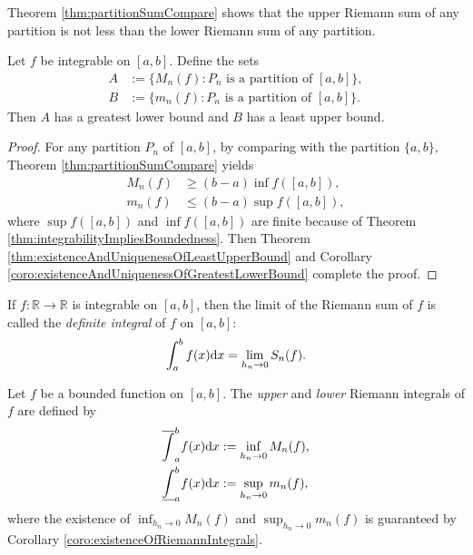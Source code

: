 \begin{rem}
  Theorem \ref{thm:partitionSumCompare} shows that
  the upper Riemann sum of any partition is not less than
  the lower Riemann sum of any partition.
\end{rem}

\begin{coro}
  \label{coro:existenceOfRiemannIntegrals}
  Let $f$ be integrable on $[a,b]$. Define the sets
  \begin{align*}
    A&:=\{ M_{n}(f): P_{n}\text{ is a partition of }[a,b] \},\\
    B&:=\{ m_{n}(f): P_{n}\text{ is a partition of }[a,b] \}.
  \end{align*}
  Then $A$ has a greatest lower bound and $B$ has
  a least upper bound. 
\end{coro}
\begin{proof}
  For any partition $P_{n}$ of $[a,b]$,
  by comparing with the partition $\{a,b\}$,
  Theorem \ref{thm:partitionSumCompare} yields
  \begin{align*}
    M_{n}(f)&\ge (b-a)\inf f([a,b]), \\
    m_{n}(f)&\le (b-a)\sup f([a,b]),
  \end{align*}
  where $\sup f([a,b])$ and $\inf f([a,b])$ are finite because of
  Theorem \ref{thm:integrabilityImpliesBoundedness}.
  Then Theorem \ref{thm:existenceAndUniquenessOfLeastUpperBound} and
  Corollary \ref{coro:existenceAndUniquenessOfGreatestLowerBound}
  complete the proof.
\end{proof}

\begin{defn}
  \label{def:definiteIntegral}
  If $f: \mathbb{R}\rightarrow \mathbb{R}$
   is integrable on $[a, b]$,
   then the limit of the Riemann sum of $f$
   is called the \emph{definite integral}
   of $f$ on $[a, b]$:
   \begin{equation}
     \label{eq:definiteIntegral}
     \int_a^b f(x)\mathrm{d} x
     = \lim_{h_n\rightarrow 0} S_n(f).
   \end{equation}
\end{defn}

\begin{defn}
  \label{def:upperLowerRiemannIntegrals}
  Let $f$ be a bounded function on $[a,b]$.
  The \emph{upper} and \emph{lower} Riemann integrals of $f$
  are defined by
   \begin{align}
    \label{eq:upperRiemannIntegrals}
    \overline{\int}_a^b f(x) \mathrm{d} x &:=
    \inf_{h_n\rightarrow 0} M_n(f), \\
      \label{eq:lowerRiemannIntegrals}
    \underline{\int}_a^b f(x) \mathrm{d} x &:=
    \sup_{h_n\rightarrow 0} m_n(f), 
  \end{align}
  where the existence of $\inf_{h_{n}\rightarrow 0} M_n(f)$ and
  $\sup_{h_{n}\rightarrow 0} m_n(f)$ is guaranteed by 
  Corollary \ref{coro:existenceOfRiemannIntegrals}.
\end{defn}

